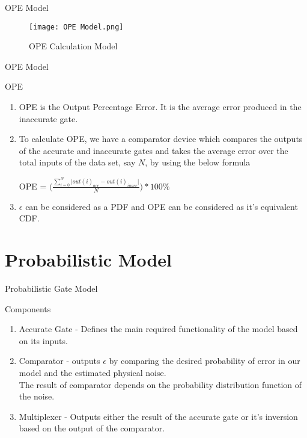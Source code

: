 \documentclass{beamer}
\begin{document}
\begin{frame}{OPE Model}
\begin{figure}
    \centering
    \texttt{[image: OPE Model.png]}
    \caption{OPE Calculation Model}
    \label{fig:my_label}
\end{figure}
\end{frame}

\begin{frame}{OPE Model}
\begin{block}{OPE}
\begin{enumerate}
    \item OPE is the Output Percentage Error. It is the average error produced in the inaccurate gate.
    \item To calculate OPE, we have a comparator device which compares the outputs of the accurate and inaccurate gates and takes the average error over the total inputs of the data set, say $N$, by using the below formula\\
    \begin{center} OPE = $\bigg( \frac{\sum_{i=0}^{N} {|{out(i)_{acc} - out(i)_{inacc}|}}}{N}\bigg) * 100\%$
    \end{center}
    \item $\epsilon$ can be considered as a PDF and OPE can be considered as it's equivalent CDF.
\end{enumerate}
\end{block}
\end{frame}

\section{Probabilistic Model}
\begin{frame}{Probabilistic Gate Model}
    \begin{block}{Components}
    \begin{enumerate}
        \item Accurate Gate - Defines the main required functionality of the model based on its inputs.
        \item Comparator - outputs $\epsilon$ by comparing the desired probability of error in our model and the estimated physical noise.\\The result of comparator depends on the probability distribution function of the noise.
        \item Multiplexer - Outputs either the result of the accurate gate or it's inversion based on the output of the comparator.
    \end{enumerate}
    \end{block}
\end{frame}
\end{document}
